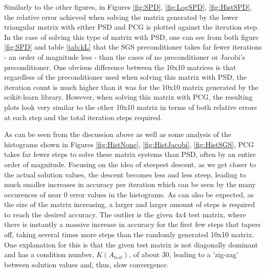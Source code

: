 \documentclass[11pt]{article}
\begin{document}
Similarly to the other figures, in Figures \ref{fig:SPD}, \ref{fig:LogSPD}, \ref{fig:HistSPD}, the relative error achieved when solving the matrix generated by the lower triangular matrix with either PSD and PCG is plotted against the iteration step. In the case of solving this type of matrix with PSD, one can see from both figure \ref{fig:SPD} and table \ref{tab:kL} that the SGS preconditioner takes far fewer iterations - an order of magnitude less - than the cases of no preconditioner or Jacobi's preconditioner. One obvious difference between the 10x10 matrices is that regardless of the preconditioner used when solving this matrix with PSD, the iteration count is much higher than it was for the 10x10 matrix generated by the scikit-learn library. However, when solving this matrix with PCG, the resulting plots look very similar to the other 10x10 matrix in terms of both relative errors at each step and the total iteration steps required.

As can be seen from the discussion above as well as some analysis of the histograms shown in Figures \ref{fig:HistNone}, \ref{fig:HistJacobi}, \ref{fig:HistSGS}, PCG takes far fewer steps to solve these matrix systems than PSD, often by an entire order of magnitude. Focusing on the idea of steepest descent, as we get closer to the actual solution values, the descent becomes less and less steep, leading to much smaller increases in accuracy per iteration which can be seen by the many occurences of near 0 error values in the histograms. As can also be expected, as the size of the matrix increasing, a larger and larger amount of steps is required to reach the desired accuracy. The outlier is the given 4x4 test matrix, where there is instantly a massive increase in accuracy for the first few steps that tapers off, taking several times more steps than the randomly generated 10x10 matrix. One explanation for this is that the given test matrix is not diagonally dominant and has a condition number, $K(A_{test})$, of about 30, leading to a 'zig-zag' between solution values and, thus, slow convergence.
\end{document}
